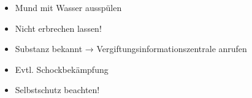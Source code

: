 \label{m:ehi-veraetzungen-haut}
\begin{itemize}
    \item Mund mit Wasser ausspülen
    \item Nicht erbrechen lassen!
    \item Substanz bekannt → Vergiftungsinformationszentrale anrufen
    \item Evtl. Schockbekämpfung
    \item Selbstschutz beachten!
\end{itemize}